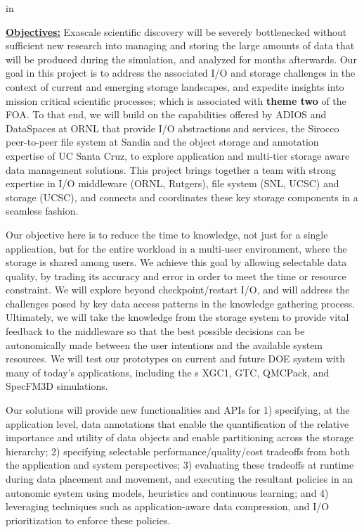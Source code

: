 \documentclass[11pt,letterpaper]{article}
\begin{document}
\setlength{\parindent}{0.5cm}

 in


\underline{\textbf{Objectives:}} Exascale scientific discovery will be
severely bottlenecked without sufficient new research into managing and
storing the large amounts of data that will be produced during the
simulation, and analyzed for months afterwards.  Our goal in this project is
to address the associated I/O and storage challenges in the context of
current and emerging storage landscapes, and expedite insights into mission
critical scientific processes; which is associated with {\bf theme two} of the FOA. To that end, we will build on the
capabilities offered by ADIOS and DataSpaces at ORNL that provide I/O abstractions
and services, the Sirocco peer-to-peer file system at
Sandia and the object storage and annotation expertise of UC Santa Cruz, to
explore application and multi-tier storage aware data management
solutions.    This project
brings together a  team with strong expertise in I/O middleware (ORNL, Rutgers), file system (SNL, UCSC) and storage (UCSC), and connects and
coordinates these key storage components in a seamless fashion.

Our objective here is to reduce the time to knowledge, not just for a single
application, but for the entire workload in a multi-user environment, where
the storage is shared among users.
We achieve this goal by allowing selectable data quality, by trading its accuracy and error
in order to meet the time or resource constraint. 
We will explore beyond 
checkpoint/restart I/O, and will address the challenges posed by 
key
data access patterns in the knowledge gathering process.
Ultimately, we will take the knowledge from the storage system to provide vital feedback to the middleware 
so that the best possible decisions can be autonomically made between the user intentions and
the available system resources.  
We will test our prototypes  on current and future DOE system with many of today's applications, including the
s XGC1, GTC, QMCPack, and SpecFM3D simulations. 

Our solutions will provide  new functionalities and APIs for
\setlength{\parindent}{0cm}
%
1) specifying, at the application level, data annotations that enable the
quantification of the relative importance and utility of data objects and
enable partitioning  across the storage hierarchy;
%
2) specifying selectable performance/quality/cost tradeoffs from both the
application and system perspectives;
%
3) evaluating these tradeoffs at runtime during data placement and movement,
and executing the resultant policies in an autonomic system using models,
heuristics and continuous learning; and
%
4) leveraging techniques such as application-aware data compression, 
and I/O prioritization to enforce these
policies.
  
\end{document}
